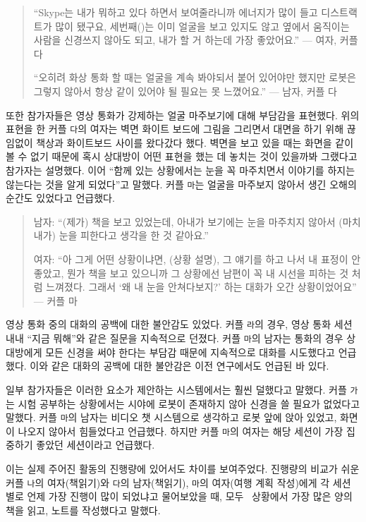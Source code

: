 \begin{quote}
``Skype는 내가 뭐하고 있다 하면서 보여줄라니까 에너지가 많이 들고 디스트랙트가 많이 됐구요, 세번째(\sysname)는 이미 얼굴을 보고 있지도 않고 옆에서 움직이는 사람을 신경쓰지 않아도 되고, 내가 할 거 하는데 가장 좋았어요.'' --- 여자, 커플 다

``오히려 화상 통화 할 때는 얼굴을 계속 봐야되서 붙어 있어야만 했지만 로봇은 그렇지 않아서 항상 같이 있어야 될 필요는 못 느꼈어요.'' --- 남자, 커플 다
\end{quote}

또한 참가자들은 영상 통화가 강제하는 얼굴 마주보기에 대해 부담감을 표현했다. 위의 표현을 한 커플 \texttt{다}의 여자는 벽면 화이트 보드에 그림을 그리면서 대면을 하기 위해 끊임없이 책상과 화이트보드 사이를 왔다갔다 했다. 벽면을 보고 있을 때는 화면을 같이 볼 수 없기 때문에 혹시 상대방이 어떤 표현을 했는 데 놓치는 것이 있을까봐 그랬다고 참가자는 설명했다. 이어 ``함께 있는 상황에서는 눈을 꼭 마주치면서 이야기를 하지는 않는다는 것을 알게 되었다''고 말했다. 커플 \texttt{마}는 얼굴을 마주보지 않아서 생긴 오해의 순간도 있었다고 언급했다.

\begin{quote}
남자: ``(제가) 책을 보고 있었는데, 아내가 보기에는 눈을 마주치지 않아서 (마치 내가) 눈을 피한다고 생각을 한 것 같아요.''

여자: ``아 그게 어떤 상황이냐면, (상황 설명), 그 얘기를 하고 나서 내 표정이 안좋았고, 뭔가 책을 보고 있으니까 그 상황에선 남편이 꼭 내 시선을 피하는 것 처럼 느껴졌다. 그래서 ‘왜 내 눈을 안쳐다보지?’ 하는 대화가 오간 상황이었어요'' --- 커플 마
\end{quote}

영상 통화 중의 대화의 공백에 대한 불안감도 있었다. 커플 \texttt{라}의 경우, 영상 통화 세션 내내 ``지금 뭐해''와 같은 질문을 지속적으로 던졌다. 커플 \texttt{마}의 남자는 통화의 경우 상대방에게 모든 신경을 써야 한다는 부담감 때문에 지속적으로 대화를 시도했다고 언급했다. 이와 같은 대화의 공백에 대한 불안감은 이전 연구\cite{mclaughlin1982awkward}에서도 언급된 바 있다.

일부 참가자들은 이러한 요소가 제안하는 \sysname 시스템에서는 훨씬 덜했다고 말했다. 커플 \texttt{가}는 시험 공부하는 상황에서는 시야에 로봇이 존재하지 않아 신경을 쓸 필요가 없었다고 말했다. 커플 \texttt{마}의 남자는 \sysname\을 비디오 챗 시스템으로 생각하고 로봇 앞에 앉아 있었고, 화면이 나오지 않아서 힘들었다고 언급했다. 하지만 커플 \texttt{마}의 여자는 해당 세션이 가장 집중하기 좋았던 세션이라고 언급했다.

이는 실제 주어진 활동의 진행량에 있어서도 차이를 보여주었다. 진행량의 비교가 쉬운 커플 \texttt{나}의 여자(책읽기)와 \texttt{다}의 남자(책읽기), \texttt{마}의 여자(여행 계획 작성)에게 각 세션 별로 언제 가장 진행이 많이 되었냐고 물어보았을 때, 모두 \sysname\ 상황에서 가장 많은 양의 책을 읽고, 노트를 작성했다고 말했다.

